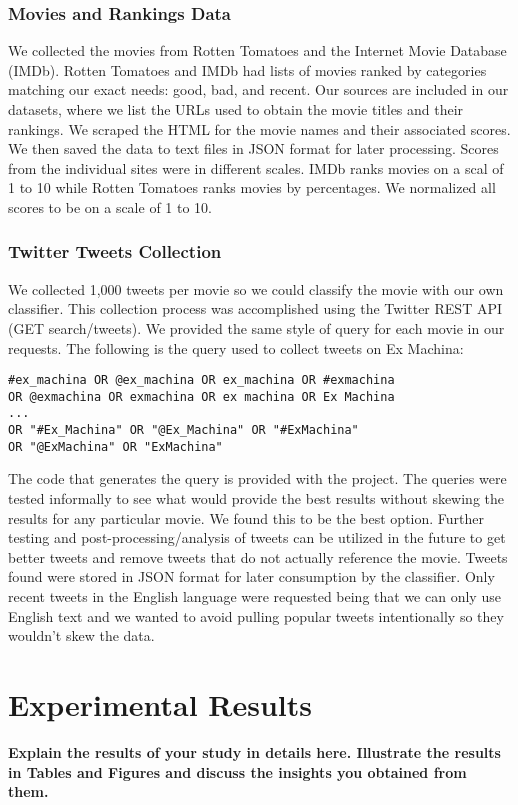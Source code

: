 \documentclass[12pt]{article}
\begin{document}
\subsubsection{Movies and Rankings Data}\label{S:4}
We collected the movies from Rotten Tomatoes and the Internet Movie Database (IMDb). Rotten Tomatoes and IMDb had lists of movies ranked by categories matching our exact needs: good, bad, and recent. Our sources are included in our datasets, where we list the URLs used to obtain the movie titles and their rankings.
We scraped the HTML for the movie names and their associated scores. We then saved the data to text files in JSON format for later processing. Scores from the individual sites were in different scales. IMDb ranks movies on a scal of 1 to 10 while Rotten Tomatoes ranks movies by percentages. We normalized all scores to be on a scale of 1 to 10.
\subsubsection{Twitter Tweets Collection}
We collected 1,000 tweets per movie so we could classify the movie with our own classifier. This collection process was accomplished using the Twitter REST API (GET search/tweets). We provided the same style of query for each movie in our requests. The following is the query used to collect tweets on Ex Machina:
\begin{verbatim}
#ex_machina OR @ex_machina OR ex_machina OR #exmachina 
OR @exmachina OR exmachina OR ex machina OR Ex Machina 
...
OR "#Ex_Machina" OR "@Ex_Machina" OR "#ExMachina" 
OR "@ExMachina" OR "ExMachina"
\end{verbatim}
The code that generates the query is provided with the project. The queries were tested informally to see what would provide the best results without skewing the results for any particular movie. We found this to be the best option. Further testing and post-processing/analysis of tweets can be utilized in the future to get better tweets and remove tweets that do not actually reference the movie.
Tweets found were stored in JSON format for later consumption by the classifier.
Only recent tweets in the English language were requested being that we can only use English text and we wanted to avoid pulling popular tweets intentionally so they wouldn't skew the data.
\section{Experimental Results}\label{S:2}
\textbf{Explain the results of your study in details here. Illustrate the results in Tables and Figures and discuss the insights you obtained from them.} \lipsum[1-9]




\end{document}
